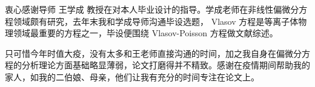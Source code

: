 \begin{acknowledgement}
  衷心感谢导师 王学成 教授在对本人毕业设计的指导。学成老师在非线性偏微分方程领域颇有研究，去年末我和学成导师沟通毕设选题， Vlasov 方程是等离子体物理领域最重要的方程之一，毕设便围绕 Vlasov-Poisson 方程做文献综述。

  只可惜今年时值大疫，没有太多和王老师直接沟通的时间，加之我自身在偏微分方程的分析理论方面基础略显薄弱，论文打磨得并不精致。感谢在疫情期间帮助我的家人，如我的二伯娘、母亲，他们让我有充分的时间专注在论文上。
\end{acknowledgement}
